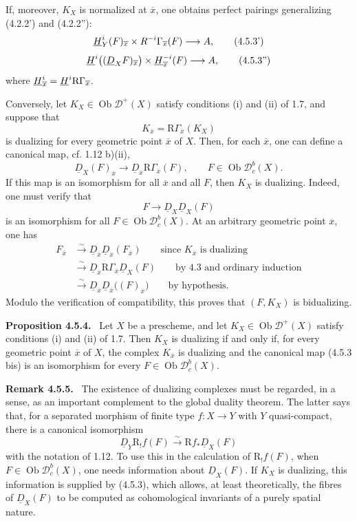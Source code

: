 \documentclass[11pt]{article}
\theoremstyle{plain}
\theoremstyle{definition}
\theoremstyle{remark}
\newenvironment{statement}[1]{\par\medskip\noindent\textbf{#1.}\ }{\par\medskip}
\newcommand{\D}{\mathcal D}\newcommand{\E}{\mathcal E}\newcommand{\F}{\mathcal F}
\DeclareMathOperator{\ob}{Ob}
\newcommand{\ol}[1]{\overline{#1}}
\newcommand{\R}{\mathrm R}
\begin{document}
If, moreover, $K_X$ is normalized at $\ol x$, one obtains perfect pairings generalizing (4.2.2') and (4.2.2''):
\[
   \uH^i_Y(F)_{\ol x}\times R^{-i}\Gamma_{\ol x}(F)\longrightarrow A,\tag{4.5.3'}
\]
\[
   \uH^i\bigl((\underline D_XF)_{\ol x}\bigr)\times
      \uH^{-i}_{\ol x}(F)\longrightarrow A,\tag{4.5.3''}
\]
where $\uH^i_{\ol x}=\uH^i\R\Gamma_{\ol x}$.

Conversely, let $K_X\in\ob\D^+(X)$ satisfy conditions (i) and (ii) of 1.7, and suppose that
\[
   K_{\ol x}=\R\Gamma_{\ol x}(K_X)
\]
is dualizing for every geometric point $\ol x$ of $X$. Then, for each $\ol x$, one can define a canonical map, cf. 1.12 b)(ii),
\[
   \underline D_X(F)_{\ol x}
      \longrightarrow \underline D_{\ol x}\R\Gamma_{\ol x}(F),
      \qquad F\in\ob\D_c^b(X).\tag{4.5.3 bis}
\]
If this map is an isomorphism for all $\ol x$ and all $F$, then $K_X$ is dualizing. Indeed, one must verify that
\[
   F\longrightarrow\underline D_X\underline D_X(F)
\]
is an isomorphism for all $F\in\ob\D_c^b(X)$. At an arbitrary geometric point $\ol x$, one has
\[
\begin{aligned}
F_{\ol x}
&\xrightarrow{\sim}\underline D_{\ol x}\underline D_{\ol x}(F_{\ol x})
     \qquad\text{since $K_{\ol x}$ is dualizing}\\
&\xrightarrow{\sim}\underline D_{\ol x}\R\Gamma_{\ol x}\underline D_X(F)
     \qquad\text{by 4.3 and ordinary induction}\\
&\xrightarrow{\sim}\underline D_{\ol x}\underline D_{\ol x}\bigl((F)_{\ol x}\bigr)
     \qquad\text{by hypothesis}.
\end{aligned}
\]
Modulo the verification of compatibility, this proves that $(F,K_X)$ is bidualizing.

\begin{statement}{Proposition 4.5.4}
Let $X$ be a prescheme, and let $K_X\in\ob\D^+(X)$ satisfy conditions (i) and (ii) of 1.7. Then $K_X$ is dualizing if and only if, for every geometric point $\ol x$ of $X$, the complex $K_{\ol x}$ is dualizing and the canonical map (4.5.3 bis) is an isomorphism for every $F\in\ob\D_c^b(X)$.
\end{statement}

\begin{statement}{Remark 4.5.5}
The existence of dualizing complexes must be regarded, in a sense, as an important complement to the global duality theorem. The latter says that, for a separated morphism of finite type $f:X\to Y$ with $Y$ quasi-compact, there is a canonical isomorphism
\[
   \underline D_Y\R_!f(F)\xrightarrow{\sim}\R f_*\underline D_X(F)
\]
with the notation of 1.12. To use this in the calculation of $\R_!f(F)$, when $F\in\ob\D_c^b(X)$, one needs information about $\underline D_X(F)$. If $K_X$ is dualizing, this information is supplied by (4.5.3), which allows, at least theoretically, the fibres of $\underline D_X(F)$ to be computed as cohomological invariants of a purely spatial nature.
\end{statement}
\end{document}

